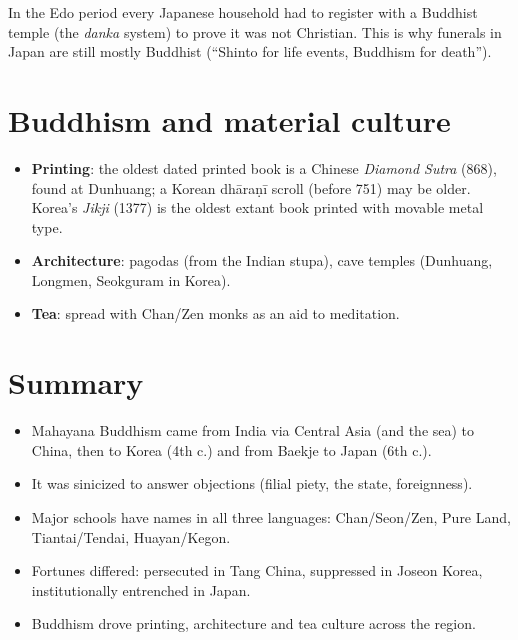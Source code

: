 \begin{remark}
In the Edo period every Japanese household had to register with a Buddhist temple (the
\emph{danka} system) to prove it was not Christian. This is why funerals in Japan are still
mostly Buddhist (``Shinto for life events, Buddhism for death'').
\end{remark}

\section{Buddhism and material culture}

\begin{itemize}
  \item \textbf{Printing}: the oldest dated printed book is a Chinese \emph{Diamond Sutra}
        (868), found at Dunhuang; a Korean dhāraṇī scroll (before 751) may be older. Korea's
        \emph{Jikji} (1377) is the oldest extant book printed with movable metal type.
  \item \textbf{Architecture}: pagodas (from the Indian stupa), cave temples (Dunhuang,
        Longmen, Seokguram in Korea).
  \item \textbf{Tea}: spread with Chan/Zen monks as an aid to meditation.
\end{itemize}

\section*{Summary}
\begin{itemize}
  \item Mahayana Buddhism came from India via Central Asia (and the sea) to China, then to
        Korea (4th c.) and from Baekje to Japan (6th c.).
  \item It was sinicized to answer objections (filial piety, the state, foreignness).
  \item Major schools have names in all three languages: Chan/Seon/Zen, Pure
        Land, Tiantai/Tendai, Huayan/Kegon.
  \item Fortunes differed: persecuted in Tang China, suppressed in Joseon Korea,
        institutionally entrenched in Japan.
  \item Buddhism drove printing, architecture and tea culture across the region.
\end{itemize}
